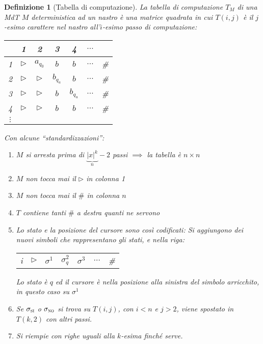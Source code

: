 \documentclass[a4paper,10pt,oneside]{article}
\theoremstyle{break}
\newtheorem{deff}{Definizione}[section]
\newcommand{\SI}{\textsc{si}}
\newcommand{\NO}{\textsc{no}}
\begin{document}
\begin{deff}[Tabella di computazione]
 La \emph{tabella di computazione} $T_M$ di una MdT $M$ deterministica ad un nastro è una matrice quadrata in cui $T(i, j)$ è il $j$-esimo carattere nel nastro all'$i$-esimo passo di computazione:

 \begin{center}
 \begin{tabular}{c | c c c c c c}
  & 1 & 2 & 3 & 4 & $\hdots$\\
  \hline
  1 & $\triangleright$ & $a_{q_0}$ & $b$ & $b$ & $\hdots$ & \#\\
  2 & $\triangleright$ & $\triangleright$ & $b_{q_a}$ & $b$ & $\hdots$& \#\\
  3 & $\triangleright$ & $\triangleright$ & $b$ & $b_{q_a}$ & $\hdots$& \#\\
  4 & $\triangleright$ & $\triangleright$ & $b$ & $b$ & $\hdots$& \#\\
  $\vdots$ &
 \end{tabular}

 \end{center}

 Con alcune ``standardizzazioni'':
 \begin{enumerate}
  \item $M$ si arresta prima di $\underbrace{|x|^k}_n - 2$ passi $\implies$ la tabella è $n\times n$
  \item $M$ non tocca mai il $\triangleright$ in colonna 1
  \item $M$ non tocca mai il $\#$ in colonna $n$
  \item $T$ contiene tanti $\#$ a destra quanti ne servono
  \item Lo stato e la posizione del cursore sono così codificati: Si aggiungono dei nuovi simboli che rappresentano gli stati, e nella riga:
  \begin{center}
   \begin{tabular}{c | c c c c c c}
    i & $\triangleright$ & $\sigma^1$ & $\sigma^2_{q}$ & $\sigma^3$ & $\hdots$& \#\\
   \end{tabular}
  \end{center}

  Lo stato è $q$ ed il cursore è nella posizione alla sinistra del simbolo arricchito, in questo caso su $\sigma^1$
 \item Se $\sigma_{\SI}$ o $\sigma_{\NO}$ si trova su $T(i, j)$, con $i < n$ e $j > 2$, viene spostato in $T(k, 2)$ con altri passi.
 \item Si riempie con righe uguali alla $k$-esima finché serve.
 \end{enumerate}

\end{deff}
\end{document}
